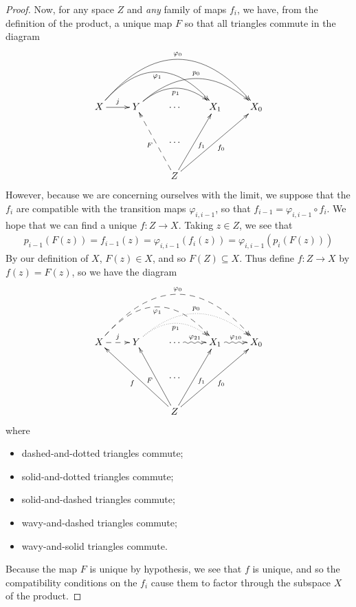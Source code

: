 \begin{proof}
        Now, for any space $Z$ and \emph{any} family of maps $f_i$, we have, from the definition of the product, a unique map $F$ so that all triangles commute in the diagram
        \begin{displaymath}
          \xymatrix{
            X \ar[r]^j \ar@/^37pt/[rrr]_{\varphi_1} \ar@/^50pt/[rrrr]^{\varphi_0}
            & Y \ar@/^20pt/[rr]_{p_1} \ar@/^30pt/[rrr]^{p_0}
            & \cdots
            & X_1
            & X_0
            \\ && \cdots \\
            && Z \ar@{-->}[uul]^F \ar[uur]_{f_1} \ar[uurr]_{f_0}
          }
        \end{displaymath}
        However, because we are concerning ourselves with the limit, we suppose that the $f_i$ are compatible with the transition maps $\varphi_{i,i-1}$, so that $f_{i-1} = \varphi_{i,i-1}\circ f_i$.
        We hope that we can find a unique $f:Z\rightarrow X$.
        Taking $z\in Z$, we see that
        \begin{align*}
          p_{i-1}(F(z)) = f_{i-1}(z) = \varphi_{i,i-1}(f_i(z)) = \varphi_{i,i-1}(p_i(F(z)))
        \end{align*}
        By our definition of $X$, $F(z)\in X$, and so $F(Z)\subseteq X$.
        Thus define $f:Z\rightarrow X$ by $f(z) = F(z)$, so we have the diagram
        \begin{displaymath}
          \xymatrix{
            X \ar@{-->}[r]^j \ar@{-->}@/^37pt/[rrr]_{\varphi_1} \ar@{-->}@/^50pt/[rrrr]^{\varphi_0}
            & Y \ar@/^20pt/@{..>}[rr]_{p_1} \ar@/^30pt/@{..>}[rrr]^{p_0}
            & \cdots \ar@{~>}[r]^{\varphi_{21}}
            & X_1 \ar@{~>}[r]^{\varphi_{10}}
            & X_0
            \\ && \cdots \\
            && Z \ar[uull]^f \ar[uul]^F \ar[uur]_{f_1} \ar[uurr]_{f_0}
          }
        \end{displaymath}
        where
        \begin{multicols}{2}
          \begin{itemize}
            \item dashed-and-dotted triangles commute;
            \item solid-and-dotted triangles commute;
            \item solid-and-dashed triangles commute;
            \item wavy-and-dashed triangles commute;
            \item wavy-and-solid triangles commute.
          \end{itemize}
        \end{multicols}
        Because the map $F$ is unique by hypothesis, we see that $f$ is unique, and so the compatibility conditions on the $f_i$ cause them to factor through the subspace $X$ of the product.
      \end{proof}

